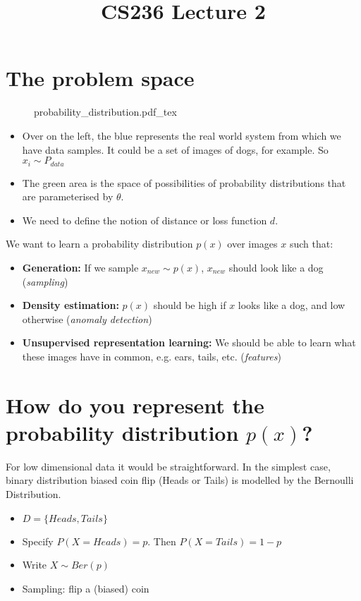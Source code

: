 \documentclass{article}
\title{CS236 Lecture 2}
\begin{document}
\maketitle
\section{The problem space}
\begin{figure}[hbt!]
    \centering
    \begin{normalsize}
        {probability_distribution.pdf_tex}
    \end{normalsize}
    \label{fig:probability_distribution}
\end{figure}


\begin{itemize}
    \item Over on the left, the blue represents the real world system from which we have data samples.  It could be a set of images of dogs, for example.  So $ x_{i} \sim P_{data} $
    \item The green area is the space of possibilities of probability distributions that are parameterised by $ \theta$.
    \item We need to define the notion of distance or loss function $d$.
\end{itemize}

We want to learn a probability distribution $ p(x) $ over images $x$ such that:
\begin{itemize}
    \item \textbf{Generation:} If we sample $ x_{new} \sim p(x) $, $ x_{new} $ should look like a dog (\emph{sampling})
    \item \textbf{Density estimation:} $ p(x) $ should be high if $x$ looks like a dog, and low otherwise (\emph{anomaly detection})
    \item \textbf{Unsupervised representation learning:} We should be able to learn what these images have in common, e.g. ears, tails, etc. (\emph{features})
\end{itemize}

\section{How do you represent the probability distribution $p(x)$?}

For low dimensional data it would be straightforward.  In the simplest case, binary distribution biased coin flip (Heads or Tails) is modelled by the Bernoulli Distribution.
\begin{itemize}
    \item $ D = \{ Heads, Tails \} $
    \item Specify $ P(X = Heads) = p $. Then $ P(X = Tails) = 1 - p $
    \item Write $ X \sim Ber(p) $
    \item Sampling: flip a (biased) coin

\end{itemize}
\end{document}
